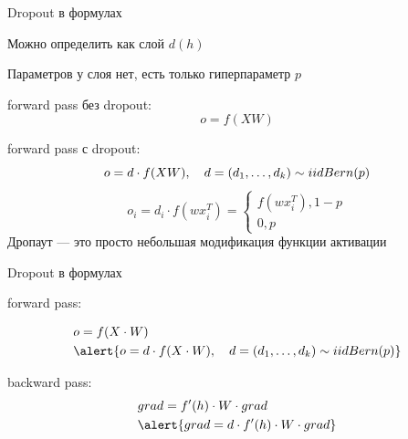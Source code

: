 \documentclass[notes,12pt, aspectratio=169]{beamer}
\newenvironment{wideitemize}{\itemize\addtolength{\itemsep}{10pt}}{\enditemize}
\begin{document}
\begin{frame}{Dropout в формулах} 
	\begin{wideitemize}
		\item  Можно определить как слой $d(h)$ 
		\item  Параметров у слоя нет, есть только гиперпараметр $p$
		\pause 
		\item  	forward pass без dropout:  \[o = f(XW)\]
		\item  	forward pass с dropout:  \[o = d \cdot f(XW), \quad d = (d_1, \ldots, d_k)  \sim iid \vspace{5mm} Bern(p)\]
		\pause 	
	\end{wideitemize}
		\[
		o_i = d_i \cdot f(w x_i^T) = \begin{cases} f(w x_i^T) , 1-p \\ 0, p \end{cases}
		\]	
	\vfill 
	\alert{Дропаут — это просто небольшая модификация функции активации}
\end{frame}


\begin{frame}{Dropout в формулах} 
	\begin{wideitemize}
		\item forward pass:
		
		\begin{equation*}
			\begin{aligned}
			& o = f(X \cdot W  ) \\
			& \alert{o = d \cdot f(X \cdot W ), \quad  d = (d_1, \ldots, d_k) \sim iid \vspace{5mm} Bern(p)} 
			\end{aligned}
		\end{equation*}
		
		\item backward pass:
		\begin{equation*}
			\begin{aligned}
			& grad = f'(h) \cdot W \cdot grad  \\
			& \alert{ grad =  d \cdot f'(h) \cdot W \cdot grad} 
			\end{aligned}
		\end{equation*}			
	\end{wideitemize}
\end{frame}
\end{document}
